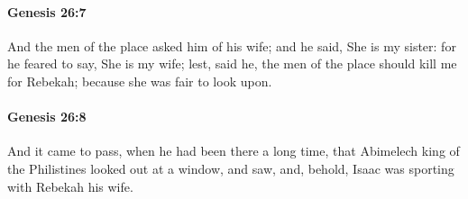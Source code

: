 		\paragraph{Genesis 26:7} %
			\label{GENESIS-26-7}

			And the men of the place asked him of his wife; and he said, She is my sister: for he feared to say, She is my wife; lest, said he, the men of the place should kill me for Rebekah; because she was fair to look upon.


		\paragraph{Genesis 26:8} %
			\label{GENESIS-26-8}

			And it came to pass, when he had been there a long time, that Abimelech king of the Philistines looked out at a window, and saw, and, behold, Isaac was sporting with Rebekah his wife.


